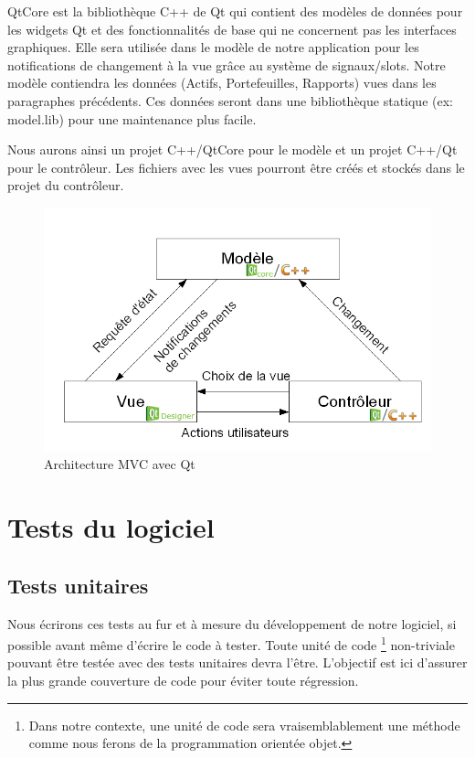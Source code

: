 \documentclass[a4paper,titlepage,french]{report}
\begin{document}
QtCore est la bibliothèque C++ de Qt qui contient des modèles de données pour les widgets Qt et des fonctionnalités de base qui ne concernent pas les interfaces graphiques. Elle sera utilisée dans le modèle de notre application pour les notifications de changement à la vue grâce au système de signaux/slots. Notre modèle contiendra les données (Actifs, Portefeuilles, Rapports) vues dans les paragraphes précédents. Ces données seront dans une bibliothèque statique (ex: model.lib) pour une maintenance plus facile.

Nous aurons ainsi un projet C++/QtCore pour le modèle et un projet C++/Qt pour le contrôleur. Les fichiers avec les vues pourront être créés et stockés dans le projet du contrôleur.

\begin{figure}[h]
  	\center
  	\includegraphics[width=1\textwidth]{mvc.png}
  	\caption{Architecture MVC avec Qt}
    \label{fig:diagramme-mvc}
\end{figure}


\section{Tests du logiciel}

\subsection{Tests unitaires}

Nous écrirons ces tests au fur et à mesure du développement de notre logiciel, si possible avant même d'écrire le code à tester.
Toute unité de code \footnote{Dans notre contexte, une unité de code sera vraisemblablement une méthode comme nous ferons de la programmation orientée objet.} non-triviale pouvant être testée avec des tests unitaires devra l'être.
L'objectif est ici d'assurer la plus grande couverture de code pour éviter toute régression.
\end{document}
